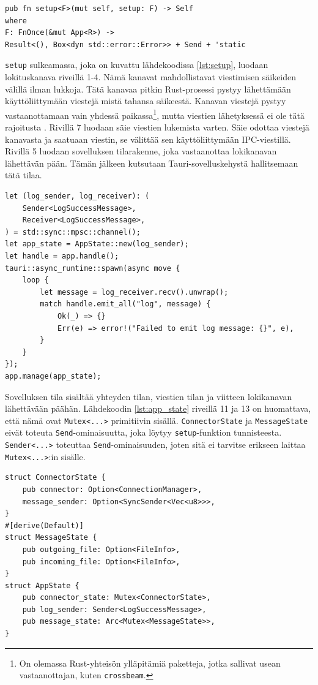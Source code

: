 \documentclass[a4paper,12pt]{article}
\begin{document}
    \begin{lstlisting}[caption={Setup-funktion tunniste}, label={lst:setup_signature}]
pub fn setup<F>(mut self, setup: F) -> Self
where
F: FnOnce(&mut App<R>) ->
Result<(), Box<dyn std::error::Error>> + Send + 'static
    \end{lstlisting}


    \lstinline{setup} sulkeamassa, joka on kuvattu lähdekoodissa \ref{lst:setup}, luodaan lokituskanava riveillä 1-4. Nämä kanavat mahdollistavat viestimisen säikeiden välillä ilman lukkoja. Tätä kanavaa pitkin Rust-prosessi pystyy lähettämään käyttöliittymään viestejä mistä tahansa säikeestä. Kanavan viestejä pystyy vastaanottamaan vain yhdessä paikassa\footnote{On olemassa Rust-yhteisön ylläpitämiä paketteja, jotka sallivat usean vastaanottajan, kuten \lstinline{crossbeam}.}, mutta viestien lähetyksessä ei ole tätä rajoitusta \cite[ch. 16.2]{rust-book}. Rivillä 7 luodaan säie viestien lukemista varten. Säie odottaa viestejä kanavasta ja saatuaan viestin, se välittää sen käyttöliittymään IPC-viestillä. Rivillä 5 luodaan sovelluksen tilarakenne, joka vastaanottaa lokikanavan lähettävän pään. Tämän jälkeen kutsutaan Tauri-sovelluskehystä hallitsemaan tätä tilaa.
    
    \begin{lstlisting}[caption={setup-sulkeuma}, label={lst:setup}]
let (log_sender, log_receiver): (
    Sender<LogSuccessMessage>,
    Receiver<LogSuccessMessage>,
) = std::sync::mpsc::channel();
let app_state = AppState::new(log_sender);
let handle = app.handle();
tauri::async_runtime::spawn(async move {
    loop {
        let message = log_receiver.recv().unwrap();
        match handle.emit_all("log", message) {
            Ok(_) => {}
            Err(e) => error!("Failed to emit log message: {}", e),
        }
    }
});
app.manage(app_state);\end{lstlisting}

    Sovelluksen tila sisältää yhteyden tilan, viestien tilan ja viitteen lokikanavan lähettävään päähän. Lähdekoodin \ref{lst:app_state} riveillä 11 ja 13 on huomattava, että nämä ovat \lstinline{Mutex<...>} primitiivin sisällä. \lstinline{ConnectorState} ja \lstinline{MessageState} eivät toteuta \lstinline{Send}-ominaisuutta, joka löytyy \lstinline{setup}-funktion tunnisteesta. \lstinline{Sender<...>} toteuttaa \lstinline{Send}-ominaisuuden, joten sitä ei tarvitse erikseen laittaa \lstinline{Mutex<...>}:in sisälle.

    
    \begin{lstlisting}[caption={Sovelluksen tilan rakenne}, label={lst:app_state}]
struct ConnectorState {
    pub connector: Option<ConnectionManager>,
    message_sender: Option<SyncSender<Vec<u8>>>,
}
#[derive(Default)]
struct MessageState {
    pub outgoing_file: Option<FileInfo>,
    pub incoming_file: Option<FileInfo>,
}
struct AppState {
    pub connector_state: Mutex<ConnectorState>,
    pub log_sender: Sender<LogSuccessMessage>,
    pub message_state: Arc<Mutex<MessageState>>,
}\end{lstlisting}
\end{document}
